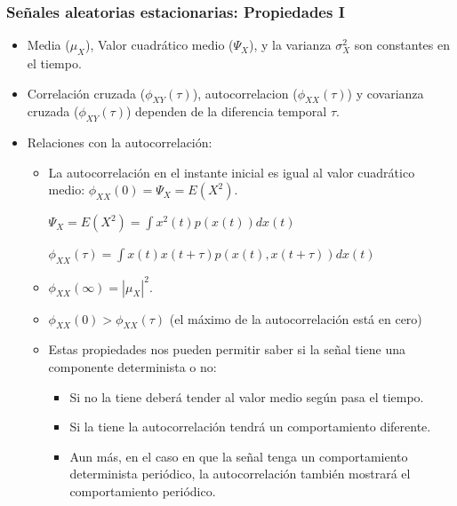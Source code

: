 \begin{frame}
\frametitle{Señales aleatorias estacionarias: Propiedades I}

\footnotesize

\begin{itemize}

\item Media ($\mu_X$), Valor cuadrático medio ($\Psi_X$), y la varianza $\sigma_X^2$ son constantes en el tiempo.
\item Correlación cruzada ($\phi_{XY}(\tau)$), autocorrelacion ($\phi_{XX}(\tau)$) y covarianza cruzada ($\phi_{XY}(\tau)$) dependen de la diferencia temporal $\tau$.

\item Relaciones con la autocorrelación:


\begin{itemize}

\footnotesize

\item La autocorrelación en el instante inicial es igual al valor cuadrático medio: $\phi_{XX}(0)=\Psi_X=E(X^2)$.

{\scriptsize
\color{gray}

$\Psi_X=E(X^2)=\int x^2(t) p(x(t))dx(t)$

$\phi_{XX}(\tau)=\int x(t)x(t+\tau) p(x(t),x(t+\tau))dx(t)$
}

\item $\phi_{XX}(\infty)=|\mu_X|^2.$

\item $\phi_{XX}(0)>\phi_{XX}(\tau)$  (el máximo de la autocorrelación está en cero)

\item Estas propiedades nos pueden permitir saber si la señal tiene una componente determinista o no:

\begin{itemize}

\item Si no la tiene deberá tender al valor medio según pasa el tiempo.
\item Si la tiene  la autocorrelación tendrá un comportamiento diferente.
\item Aun más, en el caso en que la señal tenga un comportamiento determinista periódico, la autocorrelación también mostrará el comportamiento periódico.
\end{itemize}
\end{itemize}
\end{itemize}


\end{frame}

